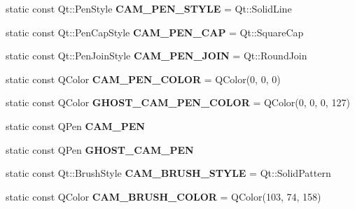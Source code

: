 \begin{DoxyCompactItemize}
\item 
\hypertarget{classCameraGUI_ac202b5df044399e3ccf1c41181f0c390}{static const Qt\-::\-Pen\-Style {\bfseries C\-A\-M\-\_\-\-P\-E\-N\-\_\-\-S\-T\-Y\-L\-E} = Qt\-::\-Solid\-Line}\label{classCameraGUI_ac202b5df044399e3ccf1c41181f0c390}

\item 
\hypertarget{classCameraGUI_a2e99509394c107afdb1de6167a137de2}{static const Qt\-::\-Pen\-Cap\-Style {\bfseries C\-A\-M\-\_\-\-P\-E\-N\-\_\-\-C\-A\-P} = Qt\-::\-Square\-Cap}\label{classCameraGUI_a2e99509394c107afdb1de6167a137de2}

\item 
\hypertarget{classCameraGUI_ab6ebad56d837fb8a910dff37b075127f}{static const Qt\-::\-Pen\-Join\-Style {\bfseries C\-A\-M\-\_\-\-P\-E\-N\-\_\-\-J\-O\-I\-N} = Qt\-::\-Round\-Join}\label{classCameraGUI_ab6ebad56d837fb8a910dff37b075127f}

\item 
\hypertarget{classCameraGUI_adcbeae7987dad32eae5d7532c4057ac1}{static const Q\-Color {\bfseries C\-A\-M\-\_\-\-P\-E\-N\-\_\-\-C\-O\-L\-O\-R} = Q\-Color(0, 0, 0)}\label{classCameraGUI_adcbeae7987dad32eae5d7532c4057ac1}

\item 
\hypertarget{classCameraGUI_a0d3c759a8f5c7e781bbb307b1cc2adf6}{static const Q\-Color {\bfseries G\-H\-O\-S\-T\-\_\-\-C\-A\-M\-\_\-\-P\-E\-N\-\_\-\-C\-O\-L\-O\-R} = Q\-Color(0, 0, 0, 127)}\label{classCameraGUI_a0d3c759a8f5c7e781bbb307b1cc2adf6}

\item 
\hypertarget{classCameraGUI_a298a8aa3eacaf56edeb881be5ad09f96}{static const Q\-Pen {\bfseries C\-A\-M\-\_\-\-P\-E\-N}}\label{classCameraGUI_a298a8aa3eacaf56edeb881be5ad09f96}

\item 
\hypertarget{classCameraGUI_ad6cb3916341cedc82c1c110487a20e8a}{static const Q\-Pen {\bfseries G\-H\-O\-S\-T\-\_\-\-C\-A\-M\-\_\-\-P\-E\-N}}\label{classCameraGUI_ad6cb3916341cedc82c1c110487a20e8a}

\item 
\hypertarget{classCameraGUI_a5dae39bcabadb82d30643023e694df53}{static const Qt\-::\-Brush\-Style {\bfseries C\-A\-M\-\_\-\-B\-R\-U\-S\-H\-\_\-\-S\-T\-Y\-L\-E} = Qt\-::\-Solid\-Pattern}\label{classCameraGUI_a5dae39bcabadb82d30643023e694df53}

\item 
\hypertarget{classCameraGUI_acb2690e862c3a4910494b41d10c71673}{static const Q\-Color {\bfseries C\-A\-M\-\_\-\-B\-R\-U\-S\-H\-\_\-\-C\-O\-L\-O\-R} = Q\-Color(103, 74, 158)}\label{classCameraGUI_acb2690e862c3a4910494b41d10c71673}


\end{DoxyCompactItemize}
